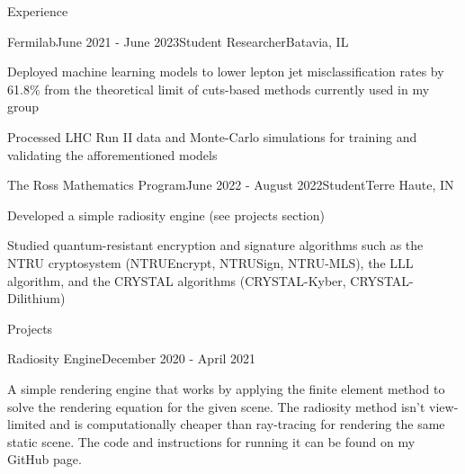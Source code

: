 \documentclass[
	11pt, %
]{resume} %
\begin{document}
\begin{rSection}{Experience}

	\begin{rSubsection}{Fermilab}{June 2021 - June 2023}{Student Researcher}{Batavia, IL}
		\item Deployed machine learning models to lower lepton jet misclassification rates by 61.8\% from the theoretical limit of cuts-based methods currently used in my group
        \item Processed LHC Run II data and Monte-Carlo simulations for training and validating the afforementioned models
	\end{rSubsection}

    \begin{rSubsection}{The Ross Mathematics Program}{June 2022 - August 2022}{Student}{Terre Haute, IN}
        \item Developed a simple radiosity engine (see projects section)
        \item Studied quantum-resistant encryption and signature algorithms such as the NTRU cryptosystem (NTRUEncrypt, NTRUSign, NTRU-MLS), the LLL algorithm, and the CRYSTAL algorithms (CRYSTAL-Kyber, CRYSTAL-Dilithium)
        
    \end{rSubsection}


\end{rSection}

\begin{rSection}{Projects}

    \begin{rSubsection}{Radiosity Engine}{December 2020 - April 2021}{}{}
		\item A simple rendering engine that works by applying the finite element method to solve the rendering equation for the given scene. The radiosity method isn't view-limited and is computationally cheaper than ray-tracing for rendering the same static scene. The code and instructions for running it can be found on my GitHub page.
	\end{rSubsection}
\end{rSection}

\end{document}
